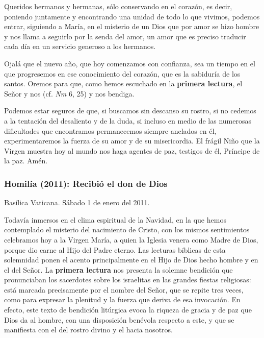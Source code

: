 {Queridos hermanos y hermanas, sólo conservando en el corazón, es decir, poniendo juntamente y encontrando una unidad de todo lo que vivimos, podemos entrar, siguiendo a María, en el misterio de un Dios que por amor se hizo hombre y nos llama a seguirlo por la senda del amor, un amor que es preciso traducir cada día en un servicio generoso a los hermanos.

Ojalá que el nuevo año, que hoy comenzamos con confianza, sea un tiempo en el que progresemos en ese conocimiento del corazón, que es la sabiduría de los santos. Oremos para que, como hemos escuchado en la \textbf{primera lectura}, el Señor  y nos  (cf. \emph{Nm} 6, 25) y nos bendiga.

Podemos estar seguros de que, si buscamos sin descanso su rostro, si no cedemos a la tentación del desaliento y de la duda, si incluso en medio de las numerosas dificultades que encontramos permanecemos siempre anclados en él, experimentaremos la fuerza de su amor y de su misericordia. El frágil Niño que la Virgen muestra hoy al mundo nos haga agentes de paz, testigos de él, Príncipe de la paz. Amén.

\subsubsection{Homilía (2011): Recibió el don de Dios}

Basílica Vaticana. Sábado 1 de enero del 2011.

Todavía inmersos en el clima espiritual de la Navidad, en la que hemos contemplado el misterio del nacimiento de Cristo, con los mismos sentimientos celebramos hoy a la Virgen María, a quien la Iglesia venera como Madre de Dios, porque dio carne al Hijo del Padre eterno. Las lecturas bíblicas de esta solemnidad ponen el acento principalmente en el Hijo de Dios hecho hombre y en el  del Señor. La \textbf{primera lectura} nos presenta la solemne bendición que pronunciaban los sacerdotes sobre los israelitas en las grandes fiestas religiosas: está marcada precisamente por el nombre del Señor, que se repite tres veces, como para expresar la plenitud y la fuerza que deriva de esa invocación. En efecto, este texto de bendición litúrgica evoca la riqueza de gracia y de paz que Dios da al hombre, con una disposición benévola respecto a este, y que se manifiesta con el  del rostro divino y el  hacia nosotros.

}
